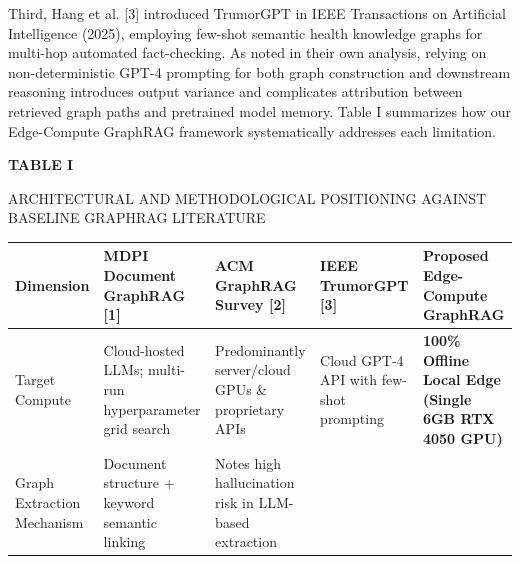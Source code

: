 Third, Hang et al. {[}3{]} introduced TrumorGPT in IEEE Transactions on
Artificial Intelligence (2025), employing few-shot semantic health
knowledge graphs for multi-hop automated fact-checking. As noted in
their own analysis, relying on non-deterministic GPT-4 prompting for
both graph construction and downstream reasoning introduces output
variance and complicates attribution between retrieved graph paths and
pretrained model memory. Table I summarizes how our Edge-Compute
GraphRAG framework systematically addresses each limitation.

\textbf{TABLE I}

\textsc{ARCHITECTURAL AND METHODOLOGICAL POSITIONING AGAINST BASELINE
GRAPHRAG LITERATURE}

\begin{longtable}[]{@{}
  >{\raggedright\arraybackslash}p{}
  >{\raggedright\arraybackslash}p{}
  >{\raggedright\arraybackslash}p{}
  >{\raggedright\arraybackslash}p{}
  >{\raggedright\arraybackslash}p{}@{}}
\toprule\noalign{}
\begin{minipage}[b]{\linewidth}\raggedright
\textbf{Dimension}
\end{minipage} & \begin{minipage}[b]{\linewidth}\raggedright
\textbf{MDPI Document GraphRAG {[}1{]}}
\end{minipage} & \begin{minipage}[b]{\linewidth}\raggedright
\textbf{ACM GraphRAG Survey {[}2{]}}
\end{minipage} & \begin{minipage}[b]{\linewidth}\raggedright
\textbf{IEEE TrumorGPT {[}3{]}}
\end{minipage} & \begin{minipage}[b]{\linewidth}\raggedright
\textbf{Proposed Edge-Compute GraphRAG}
\end{minipage} \\
\midrule\noalign{}
\endhead
\bottomrule\noalign{}
\endlastfoot
Target Compute & Cloud-hosted LLMs; multi-run hyperparameter grid search
& Predominantly server/cloud GPUs \& proprietary APIs & Cloud GPT-4 API
with few-shot prompting & \textbf{100\% Offline Local Edge (Single 6GB
RTX 4050 GPU)} \\
Graph Extraction Mechanism & Document structure + keyword semantic
linking & Notes high hallucination risk in LLM-based extraction &

\end{longtable}
